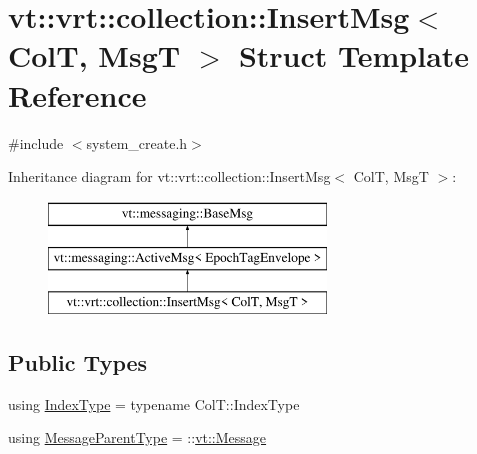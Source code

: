 \hypertarget{structvt_1_1vrt_1_1collection_1_1_insert_msg}{}\section{vt\+:\+:vrt\+:\+:collection\+:\+:Insert\+Msg$<$ ColT, MsgT $>$ Struct Template Reference}
\label{structvt_1_1vrt_1_1collection_1_1_insert_msg}


{\ttfamily \#include $<$system\+\_\+create.\+h$>$}

Inheritance diagram for vt\+:\+:vrt\+:\+:collection\+:\+:Insert\+Msg$<$ ColT, MsgT $>$\+:\begin{figure}[H]
\begin{center}
\leavevmode
\includegraphics[height=3.000000cm]{structvt_1_1vrt_1_1collection_1_1_insert_msg}
\end{center}
\end{figure}
\subsection*{Public Types}
\begin{DoxyCompactItemize}
\item 
using \hyperlink{structvt_1_1vrt_1_1collection_1_1_insert_msg_a6d0f0e849ba09859a0cda3e4785de16b}{Index\+Type} = typename Col\+T\+::\+Index\+Type
\item 
using \hyperlink{structvt_1_1vrt_1_1collection_1_1_insert_msg_aa6e47e1b16beba7083eee26139a40fff}{Message\+Parent\+Type} = \+::\hyperlink{namespacevt_a3a3ddfef40b4c90915fa43cdd5f129ea}{vt\+::\+Message}
\end{DoxyCompactItemize}
